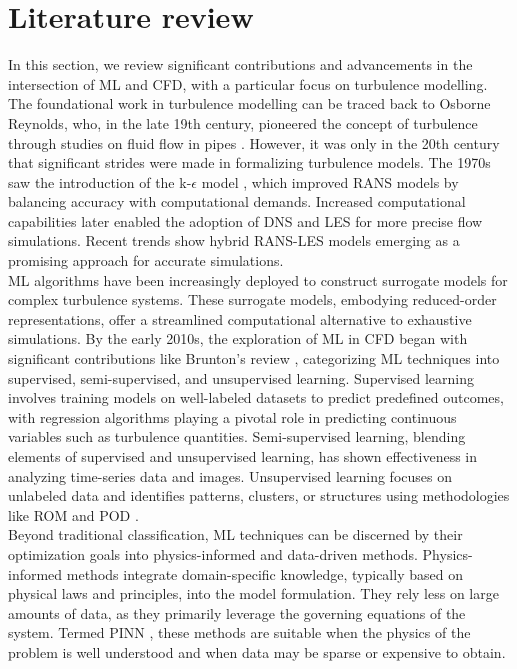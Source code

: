 \section{Literature review}
In this section, we review significant contributions and advancements in the intersection of ML and CFD, with a particular focus on turbulence modelling. The foundational work in turbulence modelling can be traced back to Osborne Reynolds, who, in the late 19th century, pioneered the concept of turbulence through studies on fluid flow in pipes \cite{reynolds1895dynamical}. However, it was only in the 20th century that significant strides were made in formalizing turbulence models. The 1970s saw the introduction of the k-$\epsilon$ model \cite{launder1974application}, which improved RANS models by balancing accuracy with computational demands. Increased computational capabilities later enabled the adoption of DNS and \gls{LES} \cite{smagorinsky1963general} for more precise flow simulations. Recent trends show hybrid RANS-LES models emerging as a promising approach for accurate simulations.\\
ML algorithms have been increasingly deployed to construct surrogate models for complex turbulence systems. These surrogate models, embodying reduced-order representations, offer a streamlined computational alternative to exhaustive simulations. By the early 2010s, the exploration of ML in CFD began with significant contributions like Brunton's review \cite{brunton}, categorizing ML techniques into supervised, semi-supervised, and unsupervised learning. Supervised learning involves training models on well-labeled datasets to predict predefined outcomes, with regression algorithms playing a pivotal role in predicting continuous variables such as turbulence quantities. Semi-supervised learning, blending elements of supervised and unsupervised learning, has shown effectiveness in analyzing time-series data and images. Unsupervised learning focuses on unlabeled data and identifies patterns, clusters, or structures using methodologies like ROM and POD \cite{berkooz1993proper}.\\
Beyond traditional classification, ML techniques can be discerned by their optimization goals into physics-informed and data-driven methods. Physics-informed methods integrate domain-specific knowledge, typically based on physical laws and principles, into the model formulation. They rely less on large amounts of data, as they primarily leverage the governing equations of the system. Termed \gls{PINN} \cite{raissi2019physics}, these methods are suitable when the physics of the problem is well understood and when data may be sparse or expensive to obtain. \\
